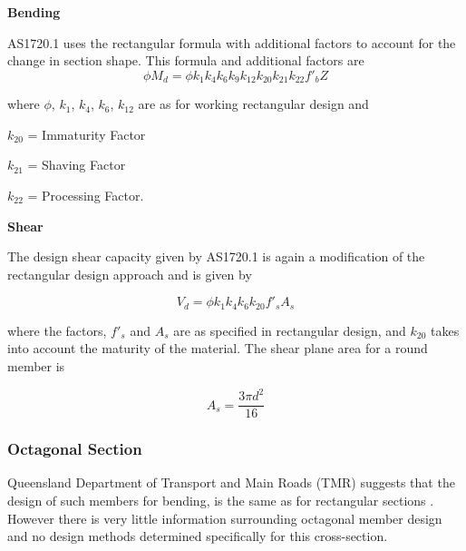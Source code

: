 \documentclass[11pt,a4paper]{article}
\numberwithin{equation}{subsection}
\begin{document}
	\vspace*{\baselineskip}
	
	\noindent
	\textbf{Bending}\par
	\noindent
    AS1720.1 uses the rectangular formula with additional factors to account for the change in section shape. This formula and additional factors are
	\begin{equation}
	\phi M_{d} = \phi k_{1} k_{4} k_{6} k_{9} k_{12} k_{20} k_{21} k_{22} f'_{b} Z
	\end{equation}

    \noindent
    where $\phi$, $k_{1}$, $k_{4}$, $k_{6}$, $k_{12}$ are as for working rectangular design and \par
    
    $ k_{20} $ = Immaturity Factor\par
    
    $ k_{21} $ = Shaving Factor\par
    
    $ k_{22} $ = Processing Factor.\par
	
	\vspace*{\baselineskip}
		
	\noindent
	\textbf{Shear}\par
	\noindent
	The design shear capacity given by AS1720.1 is again a modification of the rectangular design approach and is given by 
	
	\begin{equation}
	V_{d} = \phi k_{1} k_{4} k_{6} k_{20} f'_{s} A_{s}
	\end{equation}
	
	\noindent
	where the factors, $f'_{s}$ and $A_{s}$ are as specified in rectangular design, and $k_{20}$ takes into account the maturity of the material. The shear plane area for a round member is\par
	
	\begin{equation}
	A_{s} = \dfrac{3\pi d^{2}}{16}
	\end{equation}
	
	
	\noindent
	
	\subsubsection{Octagonal Section}
    Queensland Department of Transport and Main Roads (TMR) suggests that the design of such members for bending, is the same as for rectangular sections \cite{_timber_2005}. However there is very little information surrounding octagonal member design and no design methods determined specifically for this cross-section.
\end{document}
